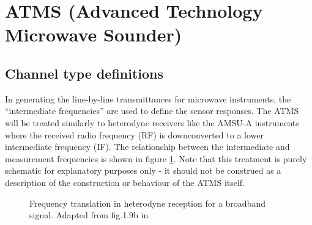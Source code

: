 \section{ATMS (Advanced Technology Microwave Sounder)}

\subsection{Channel type definitions}
In generating the line-by-line transmittances for microwave instruments, the ``intermediate frequencies'' are used to define the sensor responses. The ATMS will be treated similarly to heterodyne receivers like the AMSU-A instruments where the received radio frequency (RF) is downconverted to a lower intermediate frequency (IF). The relationship between the intermediate and measurement frequencies is shown in figure \ref{fig:broadband_frequency_translation}. Note that this treatment is purely schematic for explanatory purposes only - it should not be construed as a description of the construction or behaviour of the ATMS itself.
\begin{figure}[htp]
  \centering
  
  \caption{Frequency translation in heterodyne reception for a broadband signal. Adapted from fig.1.9b in \citet{Janssen_1993}}
  \label{fig:broadband_frequency_translation}
\end{figure}

